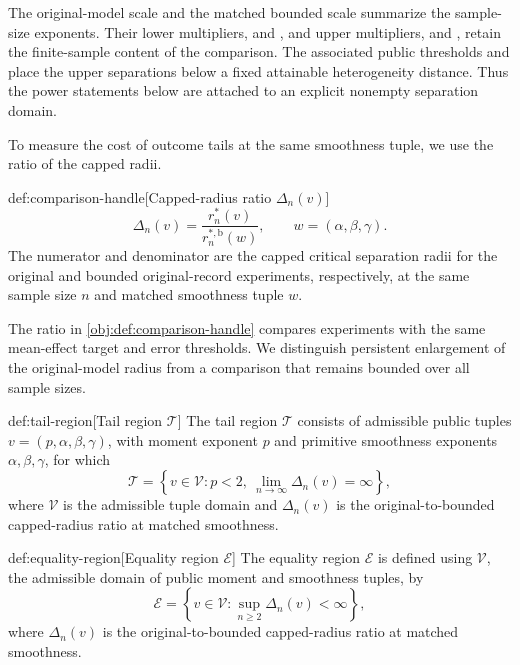 The original-model scale  and the matched bounded scale  summarize the sample-size exponents. Their lower multipliers,  and , and upper multipliers,  and , retain the finite-sample content of the comparison. The associated public thresholds  and  place the upper separations below a fixed attainable heterogeneity distance. Thus the power statements below are attached to an explicit nonempty separation domain.

To measure the cost of outcome tails at the same smoothness tuple, we use the ratio of the capped radii.

\begin{definitionv}{def:comparison-handle}[Capped-radius ratio $\Delta_n(v)$]
\[
\Delta_n(v)=\frac{r_n^*(v)}{r_n^{*,\mathrm b}(w)},
\qquad w=(\alpha,\beta,\gamma).
\]
The numerator and denominator are the capped critical separation radii for the original and bounded original-record experiments, respectively, at the same sample size \(n\) and matched smoothness tuple \(w\).
\end{definitionv}

The ratio  in \cref{obj:def:comparison-handle} compares experiments with the same mean-effect target and error thresholds. We distinguish persistent enlargement of the original-model radius from a comparison that remains bounded over all sample sizes.

\begin{definitionv}{def:tail-region}[Tail region \(\mathcal T\)]
The tail region \(\mathcal T\) consists of admissible public tuples \(v=(p,\alpha,\beta,\gamma)\), with moment exponent \(p\) and primitive smoothness exponents \(\alpha,\beta,\gamma\), for which
\[
\mathcal T
=
\left\{
v\in\mathcal V:
p<2,\ 
\lim_{n\to\infty}\Delta_n(v)=\infty
\right\},
\]
where \(\mathcal V\) is the admissible tuple domain and \(\Delta_n(v)\) is the original-to-bounded capped-radius ratio at matched smoothness.
\end{definitionv}

\begin{definitionv}{def:equality-region}[Equality region \(\mathcal E\)]
The equality region \(\mathcal E\) is defined using \(\mathcal V\), the admissible domain of public moment and smoothness tuples, by
\[
\mathcal E
=
\left\{
v\in\mathcal V:
\sup_{n\ge 2}\Delta_n(v)<\infty
\right\},
\]
where \(\Delta_n(v)\) is the original-to-bounded capped-radius ratio at matched smoothness.
\end{definitionv}

